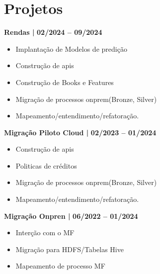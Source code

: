 \documentclass[a4paper,10pt]{article}
\newcommand{\project}[2]{
  \noindent \textbf{#1} \hfill #2 \\
  \vspace{2pt}
}
\begin{document}
\section*{Projetos}
\vspace{0.6em}
\project{Rendas | }{\textbf{02/2024 -- 09/2024}}
\vspace{-1.6em}
\begin{itemize}
\setlength\itemsep{-0.3em}
\item Implantação de Modelos de predição
\item Construção de apis
\item Construção de Books e Features
\item Migração de processos onprem(Bronze, Silver)
\item Mapeamento/entendimento/refatoração.
\end{itemize}

\project{Migração Piloto Cloud |}{\textbf{02/2023 -- 01/2024}}
\vspace{-1.6em}
\begin{itemize}
\setlength\itemsep{-0.3em}
\item Construção de apis
\item Politicas de créditos 
\item Migração de processos onprem(Bronze, Silver)
\item Mapeamento/entendimento/refatoração.
\end{itemize}

\project{Migração Onpren | }{\textbf{06/2022 -- 01/2024}}
\vspace{-1.6em}
\begin{itemize}
\setlength\itemsep{-0.3em}
\item Interção com o MF
\item Migração para HDFS/Tabelas Hive
\item Mapeamento de processo MF
\end{itemize}
\end{document}
